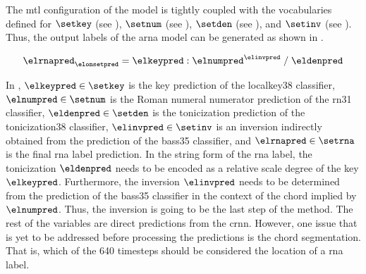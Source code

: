 
The \gls{mtl} configuration of the model is tightly coupled
with the vocabularies defined for $\setkey$ (see
), $\setnum$ (see
), $\setden$
(see ), and
$\setinv$ (see
). Thus, the
output labels of the \gls{arna} model can be generated as
shown in . 

\begin{equation}
    \label{eq:rna_pred}
    \elrnapred_{\elonsetpred} = \elkeypred : \elnumpred^{\elinvpred} \; / \; \eldenpred
\end{equation}

In , $\elkeypred \in \setkey$ is the key
prediction of the \gls{localkey38} classifier, $\elnumpred
\in \setnum$ is the Roman numeral numerator prediction of
the \gls{rn31} classifier, $\eldenpred \in \setden$ is the
tonicization prediction of the \gls{tonicization38}
classifier, $\elinvpred \in \setinv$ is an inversion
indirectly obtained from the prediction of the \gls{bass35}
classifier, and $\elrnapred \in \setrna$ is the final
\gls{rna} label prediction. In the string form of the
\gls{rna} label, the tonicization $\eldenpred$ needs to be
encoded as a relative scale degree of the key $\elkeypred$.
Furthermore, the inversion $\elinvpred$ needs to be
determined from the prediction of the \gls{bass35}
classifier in the context of the chord implied by
$\elnumpred$. Thus, the inversion is going to be the last
step of the method. The rest of the variables are direct
predictions from the \gls{crnn}. However, one issue that is
yet to be addressed before processing the predictions is the
chord segmentation. That is, which of the 640 timesteps
should be considered the location of a \gls{rna} label. 

